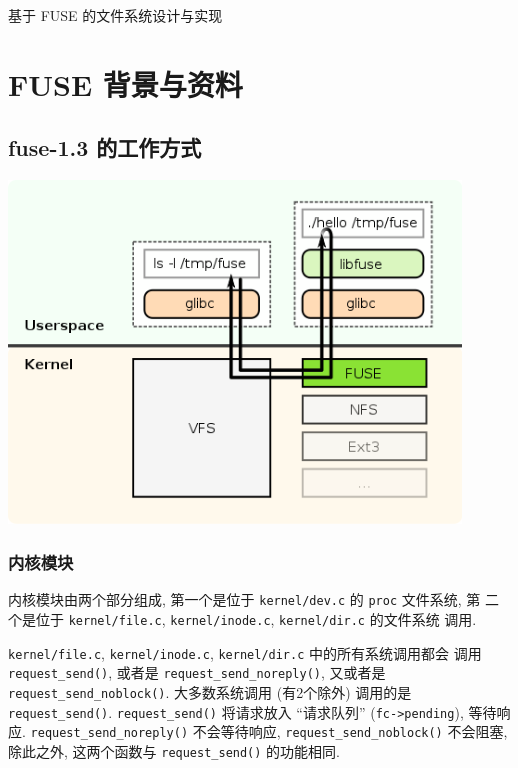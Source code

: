 \documentclass[nofonts]{ctexart}
\begin{document}
\begin{center}
    \Huge{基于 FUSE 的文件系统设计与实现}\label{ux57faux4e8e-fuse-ux7684ux6587ux4ef6ux7cfbux7edfux8bbeux8ba1ux4e0eux5b9eux73b0}
\end{center}

\tableofcontents

\section{FUSE 背景与资料}\label{fuse-ux80ccux666fux4e0eux8d44ux6599}

\subsection{fuse-1.3 的工作方式}

\begin{center}
\includegraphics[width=12cm]{./images/./FUSE_structure.svg.png}
\end{center}
\label{fig:fuse_structure}

\subsubsection{内核模块}\label{ux5185ux6838ux6a21ux5757}

内核模块由两个部分组成, 第一个是位于 \texttt{kernel/dev.c} 的
\texttt{proc} 文件系统, 第 二个是位于 \texttt{kernel/file.c},
\texttt{kernel/inode.c}, \texttt{kernel/dir.c} 的文件系统 调用.

\texttt{kernel/file.c}, \texttt{kernel/inode.c}, \texttt{kernel/dir.c}
中的所有系统调用都会 调用 \texttt{request\_send()}, 或者是
\texttt{request\_send\_noreply()}, 又或者是
\texttt{request\_send\_noblock()}. 大多数系统调用 (有2个除外) 调用的是
\texttt{request\_send()}. \texttt{request\_send()} 将请求放入
``请求队列'' (\texttt{fc-\textgreater{}pending}), 等待响应.
\texttt{request\_send\_noreply()} 不会等待响应,
\texttt{request\_send\_noblock()} 不会阻塞, 除此之外, 这两个函数与
\texttt{request\_send()} 的功能相同.
\end{document}
